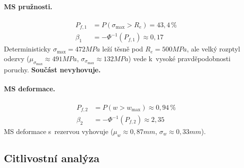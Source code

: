 \paragraph{MS pružnosti.}
\begin{align}
    P_{f,1} &= P(\sigma_{\max} > R_e) = \boxed{43{,}4\,\%} \\
    \beta_1 &= -\Phi^{-1}(P_{f,1}) \approx 0{,}17
\end{align}
Deterministicky $\sigma_{\max} = 472\unit{MPa}$ leží těsně pod $R_e = 500\unit{MPa}$, ale velký rozptyl odezvy ($\mu_{\sigma_{\max}} \approx 491\unit{MPa}$, $\sigma_{\sigma_{\max}} \approx 132\unit{MPa}$) vede k~vysoké pravděpodobnosti poruchy. \textbf{Součást nevyhovuje.}

\paragraph{MS deformace.}
\begin{align}
    P_{f,2} &= P(w > w_{\max}) \approx \boxed{0{,}94\,\%} \\
    \beta_2 &= -\Phi^{-1}(P_{f,2}) \approx 2{,}35
\end{align}
MS deformace s~rezervou vyhovuje ($\mu_w \approx 0{,}87\unit{mm}$, $\sigma_w \approx 0{,}33\unit{mm}$).

\subsection{Citlivostní analýza}


